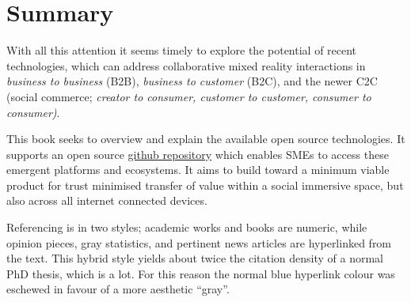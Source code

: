\section{Summary}
With all this attention it seems timely to explore the potential of recent technologies, which can address collaborative mixed reality interactions in \textit{business to business} (B2B), \textit{business to customer} (B2C), and the newer C2C (social commerce; \textit{creator to consumer, customer to customer, consumer to consumer\cite{jones2008trust})}. \par %
This book seeks to overview and explain the available open source technologies. It supports an open source \href{https://github.com/flossverse/product}{github repository} which enables SMEs to access these emergent platforms and ecosystems. It aims to build toward a minimum viable product for trust minimised transfer of value within a social immersive space, but also across all internet connected devices.\par
Referencing is in two styles; academic works and books are numeric, while opinion pieces, gray statistics, and pertinent news articles are hyperlinked from the text. This hybrid style yields about twice the citation density of a normal PhD thesis, which is a lot. For this reason the normal blue hyperlink colour was eschewed in favour of a more aesthetic ``gray''. \par%
